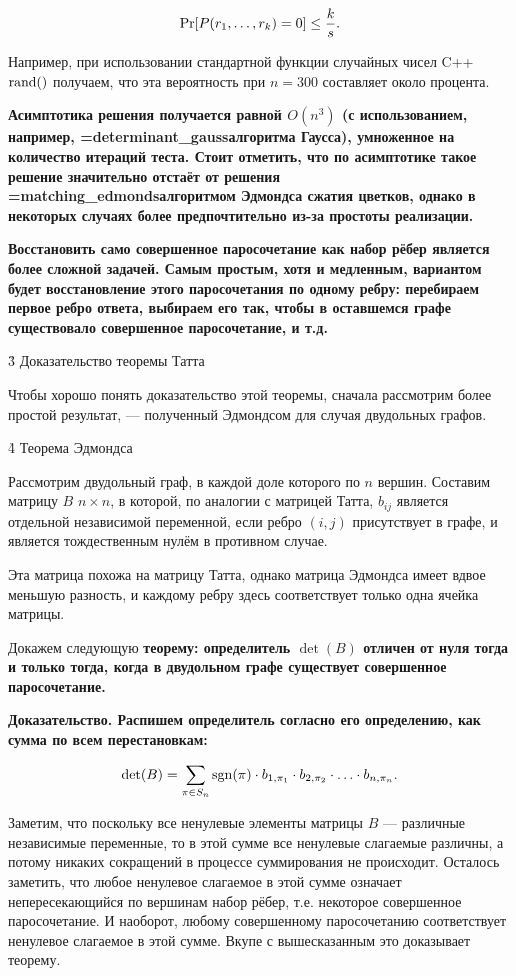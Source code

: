 $$ {\rm Pr}[P(r_1,\ldots,r_k)=0] \le \frac{k}{s}. $$

Например, при использовании стандартной функции случайных чисел C++ $\rm rand()$ получаем, что эта вероятность при $n=300$ составляет около процента.

\bf{Асимптотика} решения получается равной $O(n^3)$ (с использованием, например, \algohref=determinant_gauss{алгоритма Гаусса}), умноженное на количество итераций теста. Стоит отметить, что по асимптотике такое решение значительно отстаёт от решения \algohref=matching_edmonds{алгоритмом Эдмондса сжатия цветков}, однако в некоторых случаях более предпочтительно из-за простоты реализации.

\bf{Восстановить} само совершенное паросочетание как набор рёбер является более сложной задачей. Самым простым, хотя и медленным, вариантом будет восстановление этого паросочетания по одному ребру: перебираем первое ребро ответа, выбираем его так, чтобы в оставшемся графе существовало совершенное паросочетание, и т.д.


\h3{ Доказательство теоремы Татта }

Чтобы хорошо понять доказательство этой теоремы, сначала рассмотрим более простой результат, --- полученный Эдмондсом для случая двудольных графов.


\h4{ Теорема Эдмондса }

Рассмотрим двудольный граф, в каждой доле которого по $n$ вершин. Составим матрицу $B$ $n \times n$, в которой, по аналогии с матрицей Татта, $b_{ij}$ является отдельной независимой переменной, если ребро $(i,j)$ присутствует в графе, и является тождественным нулём в противном случае.

Эта матрица похожа на матрицу Татта, однако матрица Эдмондса имеет вдвое меньшую разность, и каждому ребру здесь соответствует только одна ячейка матрицы.

Докажем следующую \bf{теорему}: определитель $\det(B)$ отличен от нуля тогда и только тогда, когда в двудольном графе существует совершенное паросочетание.

\bf{Доказательство}. Распишем определитель согласно его определению, как сумма по всем перестановкам:

$$ \det(B) = \sum_{\pi \in S_n} {\rm sgn}(\pi) \cdot b_{1,\pi_1} \cdot b_{2,\pi_2} \cdot \ldots \cdot b_{n,\pi_n}. $$

Заметим, что поскольку все ненулевые элементы матрицы $B$ --- различные независимые переменные, то в этой сумме все ненулевые слагаемые различны, а потому никаких сокращений в процессе суммирования не происходит. Осталось заметить, что любое ненулевое слагаемое в этой сумме означает непересекающийся по вершинам набор рёбер, т.е. некоторое совершенное паросочетание. И наоборот, любому совершенному паросочетанию соответствует ненулевое слагаемое в этой сумме. Вкупе с вышесказанным это доказывает теорему.


